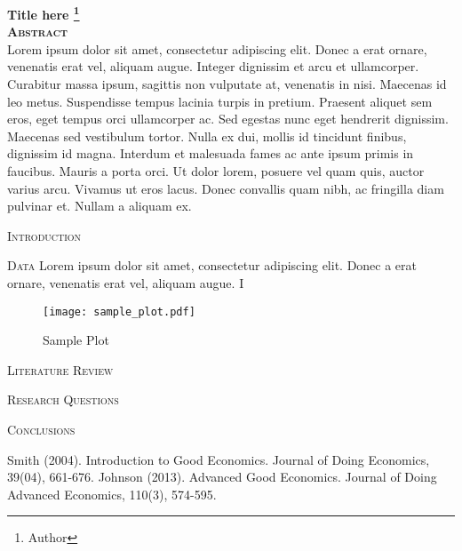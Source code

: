 \documentclass[10pt]{article}
\begin{document}
\textbf{Title here \footnote{Author}}
\\

\textsc{\textbf{Abstract}} \\ Lorem ipsum dolor sit amet, consectetur adipiscing elit. Donec a erat ornare, venenatis erat vel, aliquam augue. Integer dignissim et arcu et ullamcorper. Curabitur massa ipsum, sagittis non vulputate at, venenatis in nisi. Maecenas id leo metus. Suspendisse tempus lacinia turpis in pretium. Praesent aliquet sem eros, eget tempus orci ullamcorper ac. Sed egestas nunc eget hendrerit dignissim. Maecenas sed vestibulum tortor. Nulla ex dui, mollis id tincidunt finibus, dignissim id magna. Interdum et malesuada fames ac ante ipsum primis in faucibus. Mauris a porta orci. Ut dolor lorem, posuere vel quam quis, auctor varius arcu. Vivamus ut eros lacus. Donec convallis quam nibh, ac fringilla diam pulvinar et. Nullam a aliquam ex.

\begin{outline}[enumerate]



\1 \textsc{Introduction}

\1 \textsc{Data}
\2 Lorem ipsum dolor sit amet, consectetur adipiscing elit. Donec a erat ornare, venenatis erat vel, aliquam augue. I

\begin{figure}[h]
 \caption{Sample Plot}
  \centering
    \texttt{[image: sample\_plot.pdf]}
\end{figure}



\1 \textsc{Literature Review}

\1 \textsc{Research Questions}

\1  \textsc{Conclusions}


\end{outline}


\begin{thebibliography}{99}

 Smith (2004). Introduction to Good Economics. Journal of Doing Economics, 39(04), 661-676.
 Johnson (2013). Advanced Good Economics. Journal of Doing Advanced Economics, 110(3), 574-595.



\end{thebibliography}
\end{document}
